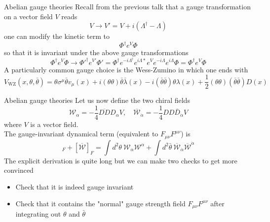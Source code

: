 \documentclass[10pt]{beamer}
\begin{document}
\begin{frame}{Abelian gauge theories}
Recall from the previous talk that a gauge transformation on a vector field $V$ reads
\begin{equation*}
    V \to V' = V + i(\Lambda^{\dagger} - \Lambda)
\end{equation*}
one can modify the kinetic term to
\begin{equation*}
    \Phi^{\dagger} e^V \Phi
\end{equation*}
so that it is invariant under the above gauge transformations
\begin{equation*}
    \Phi^{\dagger}e^V\Phi \to \Phi '^{\dagger}  e^{V'} \Phi ' = \Phi^{\dagger}e^{-i\Lambda^{\dagger}}e^{i\Lambda*}e^Ve^{-i\Lambda}e^{i\Lambda}\Phi = \Phi^{\dagger}e^V\Phi
\end{equation*}
A particularly common gauge choice is the Wess-Zumino in which one ends with
\begin{equation*}
    V_{\mathrm{WZ}}(x, \theta, \bar{\theta})=\theta \sigma^{\mu} \bar{\theta} v_{\mu}(x)+i(\theta \theta) \bar{\theta} \bar{\lambda}(x)-i(\bar{\theta} \bar{\theta}) \theta \lambda(x)+\frac{1}{2}(\theta \theta)(\bar{\theta} \bar{\theta}) D(x)
\end{equation*}
\end{frame}


\begin{frame}{Abelian gauge theories}
Let us now define the two chiral fields \\
\begin{equation*}
    \mathcal{W}_{\alpha}=-\frac{1}{4} \overline{D D} D_{\alpha} V, \quad \overline{\mathcal{W}}_{\dot{\alpha}} = -\frac{1}{4} D D \bar{D}_{\dot{\alpha}} V
\end{equation*}
where $V$ is a vector field. \\
The gauge-invariant dynamical term (equivalent to $F_{\mu\nu} F^{\mu\nu}$) is 
\begin{equation*}
   [\mathcal{W}]_F + [\overline{\mathcal{W}}]_F = \int d^2\theta \ \mathcal{W}_{\alpha} \mathcal{W}^{\alpha} + \int d^2\bar\theta \ \overline{\mathcal{W}}_{\dot\alpha} \overline{\mathcal{W}}^{\dot\alpha}
\end{equation*}
The explicit derivation is quite long but we can make two checks to get more convinced
\begin{itemize}
    \item Check that it is indeed gauge invariant
    \item Check that it contains the "normal" gauge strength field $F_{\mu\nu}F^{\mu\nu}$ after integrating out $\theta$ and $\bar\theta$
\end{itemize}
\end{frame}
\end{document}
